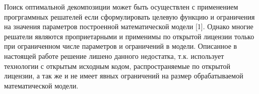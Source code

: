 

Поиск оптимальной декомпозиции может быть осуществлен с применением прогргаммных решателей если сформулировать целевую функцию и ограничения на значения параметров построенной математической модели [1]. Однако многие решатели являются проприетарными и применимы по открытой лицензии только при ограниченном числе параметров и ограничений в модели. Описанное в настоящей работе решение лишено данного недостатка, т.к. использует технологии с открытым исходным кодом, распространяемые по открытой лицензии, а так же и не имеет явных ограничений на размер обрабатываемой математической модели.

